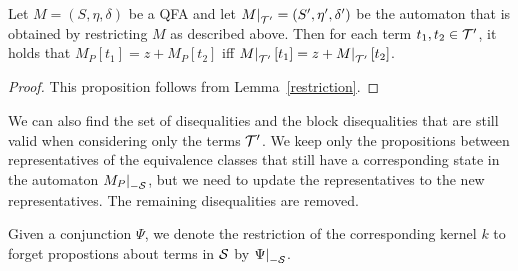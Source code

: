 \begin{proposition}
    Let $M = (S, \eta, \delta)$ be a QFA and let $\restr{M}{\T'} = (S', \eta', \delta')$ be the automaton that is obtained by restricting $M$ as described above.
    Then for each term $t_1, t_2 \in \mathcal{T}'$, it holds that $M_P[t_1] = z + M_P[t_2]$ iff $\restr{M}{\T'}[t_1] = z + \restr{M}{\T'}[t_2]$.
\end{proposition}
\begin{proof}
    This proposition follows from Lemma~\ref{restriction}.
\end{proof}

We can also find the set of disequalities and the block disequalities that are still valid when considering only the terms $\mathcal{T}'$.
We keep only the propositions between representatives of the equivalence classes that
still have a corresponding state in the automaton $\restr{M_P}{-\Set}$, but we need to update the representatives to the new representatives.
The remaining disequalities are removed.

Given a conjunction $\Psi$, we denote the restriction of the corresponding kernel $k$ to forget propostions about terms in $\mathcal{S}$ by $\restr{\Psi}{-\Set}$.
